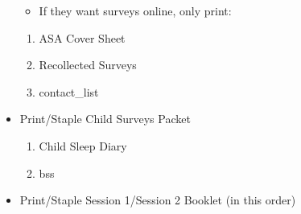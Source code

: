 \documentclass[
]{book}
\providecommand{\tightlist}{%
  \setlength{\itemsep}{0pt}\setlength{\parskip}{0pt}}
\begin{document}
\begin{itemize}
  \begin{itemize}
  \tightlist
  \item
    If they want surveys online, only print:
  \end{itemize}

  \begin{enumerate}
  \def\labelenumi{\arabic{enumi}.}
  \tightlist
  \item
    ASA Cover Sheet
  \item
    Recollected Surveys
  \item
    contact\_list
  \end{enumerate}
\item
  Print/Staple Child Surveys Packet

  \begin{enumerate}
  \def\labelenumi{\arabic{enumi}.}
  \tightlist
  \item
    Child Sleep Diary
  \item
    bss
  \end{enumerate}
\item
  Print/Staple Session 1/Session 2 Booklet (in this order)


\end{itemize}
\end{document}
